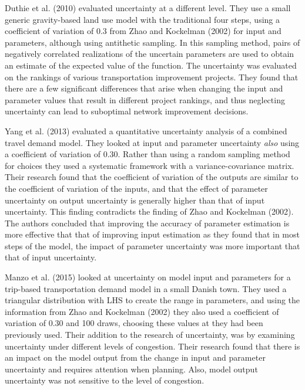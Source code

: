 \documentclass[
  futuretransp,
  submit,
  moreauthors,
]{Definitions/mdpi}
\begin{document}
Duthie et al. (2010) evaluated uncertainty at a different level. They
use a small generic gravity-based land use model with the traditional
four steps, using a coefficient of variation of 0.3 from Zhao and
Kockelman (2002) for input and parameters, although using antithetic
sampling. In this sampling method, pairs of negatively correlated
realizations of the uncertain parameters are used to obtain an estimate
of the expected value of the function. The uncertainty was evaluated on
the rankings of various transportation improvement projects. They found
that there are a few significant differences that arise when changing
the input and parameter values that result in different project
rankings, and thus neglecting uncertainty can lead to suboptimal network
improvement decisions.

Yang et al. (2013) evaluated a quantitative uncertainty analysis of a
combined travel demand model. They looked at input and parameter
uncertainty \emph{also} using a coefficient of variation of 0.30. Rather
than using a random sampling method for choices they used a systematic
framework with a variance-covariance matrix. Their research found that
the coefficient of variation of the outputs are similar to the
coefficient of variation of the inputs, and that the effect of parameter
uncertainty on output uncertainty is generally higher than that of input
uncertainty. This finding contradicts the finding of Zhao and Kockelman
(2002). The authors concluded that improving the accuracy of parameter
estimation is more effective that that of improving input estimation as
they found that in most steps of the model, the impact of parameter
uncertainty was more important that that of input uncertainty.

Manzo et al. (2015) looked at uncertainty on model input and parameters
for a trip-based transportation demand model in a small Danish town.
They used a triangular distribution with LHS to create the range in
parameters, and using the information from Zhao and Kockelman (2002)
they also used a coefficient of variation of 0.30 and 100 draws,
choosing these values at they had been previously used. Their addition
to the research of uncertainty, was by examining uncertainty under
different levels of congestion. Their research found that there is an
impact on the model output from the change in input and parameter
uncertainty and requires attention when planning. Also, model output
uncertainty was not sensitive to the level of congestion.
\end{document}
